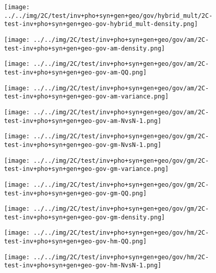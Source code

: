 \begin{figure}[H]
\centering	\texttt{[image: ../../img/2C/test/inv+pho+syn+gen+geo/gov/hybrid\_mult/2C-test-inv+pho+syn+gen+geo-gov-hybrid\_mult-density.png]}
\end{figure}
\begin{figure}[H]
\centering	\texttt{[image: ../../img/2C/test/inv+pho+syn+gen+geo/gov/am/2C-test-inv+pho+syn+gen+geo-gov-am-density.png]}
\end{figure}
\begin{figure}[H]
\centering	\texttt{[image: ../../img/2C/test/inv+pho+syn+gen+geo/gov/am/2C-test-inv+pho+syn+gen+geo-gov-am-QQ.png]}
\end{figure}
\begin{figure}[H]
\centering	\texttt{[image: ../../img/2C/test/inv+pho+syn+gen+geo/gov/am/2C-test-inv+pho+syn+gen+geo-gov-am-variance.png]}
\end{figure}
\begin{figure}[H]
\centering	\texttt{[image: ../../img/2C/test/inv+pho+syn+gen+geo/gov/am/2C-test-inv+pho+syn+gen+geo-gov-am-NvsN-1.png]}
\end{figure}
\begin{figure}[H]
\centering	\texttt{[image: ../../img/2C/test/inv+pho+syn+gen+geo/gov/gm/2C-test-inv+pho+syn+gen+geo-gov-gm-NvsN-1.png]}
\end{figure}
\begin{figure}[H]
\centering	\texttt{[image: ../../img/2C/test/inv+pho+syn+gen+geo/gov/gm/2C-test-inv+pho+syn+gen+geo-gov-gm-variance.png]}
\end{figure}
\begin{figure}[H]
\centering	\texttt{[image: ../../img/2C/test/inv+pho+syn+gen+geo/gov/gm/2C-test-inv+pho+syn+gen+geo-gov-gm-QQ.png]}
\end{figure}
\begin{figure}[H]
\centering	\texttt{[image: ../../img/2C/test/inv+pho+syn+gen+geo/gov/gm/2C-test-inv+pho+syn+gen+geo-gov-gm-density.png]}
\end{figure}
\begin{figure}[H]
\centering	\texttt{[image: ../../img/2C/test/inv+pho+syn+gen+geo/gov/hm/2C-test-inv+pho+syn+gen+geo-gov-hm-QQ.png]}
\end{figure}
\begin{figure}[H]
\centering	\texttt{[image: ../../img/2C/test/inv+pho+syn+gen+geo/gov/hm/2C-test-inv+pho+syn+gen+geo-gov-hm-NvsN-1.png]}
\end{figure}
